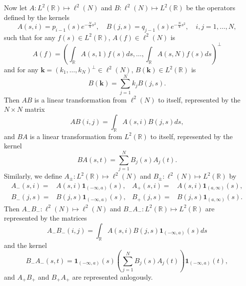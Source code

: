 \documentclass[11pt, a4paper]{article}
\numberwithin{equation}{section}
\newcommand{\id}{\mathbf{1}}
\newcommand{\realR}{\mathbb{R}}
\renewcommand{\vec}[1]{\mathbf{#1}}
\theoremstyle{definition}
\theoremstyle{remark}
\begin{document}
Now let $A: L^2(\realR) \mapsto \ell^2(N)$ and $B: \ell^2(N) \mapsto L^2(\realR)$ be the operators defined by the kernels
\begin{equation} \label{eq:expr_of_A_B}
  A(s, i) = p_{i - 1}(s) e^{-\frac{N}{4}s^2}, \quad B(j, s) = q_{j - 1}(s) e^{-\frac{N}{4}s^2}, \quad i, j = 1, \dotsc, N,
\end{equation}
such that for any $f(s) \in L^2(\realR)$, $A(f) \in \ell^2(N)$ is
\begin{equation}
  A(f) = \left( \int_{\realR} A(s, 1) f(s) ds, \dotsc, \int_{\realR} A(s, N) f(s) ds \right)^{\perp}
\end{equation}
and for any $\vec{k} = (k_1, \dotsc, k_N)^{\perp} \in \ell^2(N)$, $B(\vec{k}) \in L^2(\realR)$ is
\begin{equation}
  B(\vec{k}) = \sum^N_{j = 1} k_j B(j, s).
\end{equation}
Then $AB$ is a linear transformation from $\ell^2(N)$ to itself, represented by the $N \times N$ matrix
\begin{equation}
  AB(i, j) = \int_{\realR} A(s, i) B(j, s) ds,
\end{equation}
and $BA$ is a linear transformation from $L^2(\realR)$ to itself, represented by the kernel
\begin{equation}
  BA(s, t) = \sum^N_{j = 1} B_j(s) A_j(t).
\end{equation}
Similarly, we define $A_{\pm}: L^2(\realR) \mapsto \ell^2(N)$ and $B_{\pm}: \ell^2(N) \mapsto L^2(\realR)$ by
\begin{equation} \label{eq:A_B_pm}
  \begin{aligned}
    A_-(s, i) = {}& A(s, i) \id_{(-\infty, a)}(s), & A_+(s, i) = {}& A(s, i) \id_{(a, \infty)}(s), \\
    B_-(j, s) = {}& B(j, s) \id_{(-\infty, a)}(s), & B_+(j, s) = {}& B(j, s) \id_{(a, \infty)}(s).
  \end{aligned}
\end{equation}
Then $A_- B_-: \ell^2(N) \mapsto \ell^2(N)$ and $B_- A_-: L^2(\realR) \mapsto L^2(\realR)$ are represented by the matrices
\begin{equation}
  A_- B_-(i, j) = \int_{\realR} A(s, i) B(j, s) \id_{(-\infty, a)}(s) ds
\end{equation}
and the kernel
\begin{equation} \label{eq:kernel_B-A-}
  B_- A_-(s, t) = \id_{(-\infty, a)}(s) \left( \sum^N_{j = 1} B_j(s) A_j(t) \right) \id_{(-\infty, a)}(t),
\end{equation}
and $A_+ B_+$ and $B_+ A_+$ are represented anlogously.
\end{document}
